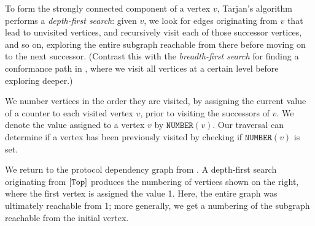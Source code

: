 \documentclass[../generics]{subfiles}
\begin{document}
\newcommand{\Number}[1]{\texttt{NUMBER}(#1)}
\newcommand{\Lowlink}[1]{\texttt{LOWLINK}(#1)}
\newcommand{\OnStack}[1]{\texttt{ONSTACK}(#1)}

To form the strongly connected component of a vertex $v$, Tarjan's algorithm performs a \emph{depth-first search}: given $v$, we look for edges originating from $v$ that lead to unvisited vertices, and recursively visit each of those successor vertices, and so on, exploring the entire subgraph reachable from there before moving on to the next successor. (Contrast this with the \emph{breadth-first search} for finding a conformance path in , where we visit all vertices at a certain level before exploring deeper.)

\begin{wrapfigure}[11]{r}{2.9cm}
\end{wrapfigure}

We number vertices in the order they are visited, by assigning the current value of a counter to each visited vertex $v$, prior to visiting the successors of $v$. We denote the value assigned to a vertex $v$ by $\Number{v}$. Our traversal can determine if a vertex has been previously visited by checking if $\Number{v}$ is set.

We return to the protocol dependency graph from . A depth-first search originating from $[\texttt{Top}]$ produces the numbering of vertices shown on the right, where the first vertex is assigned the value 1. Here, the entire graph was ultimately reachable from 1; more generally, we get a numbering of the subgraph reachable from the initial vertex.
\end{document}
